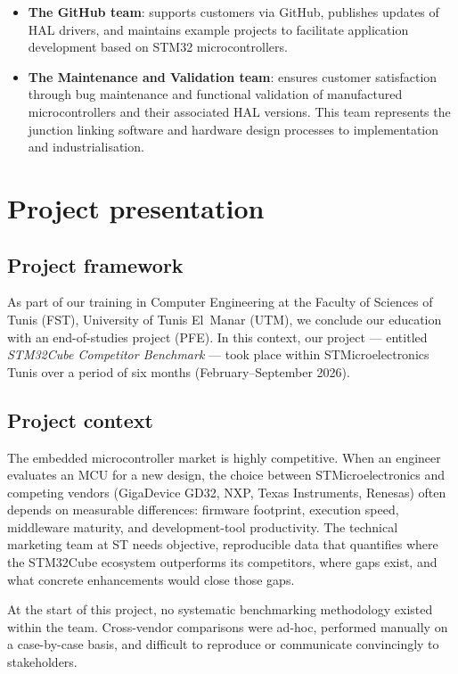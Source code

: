 \begin{itemize}
\item \textbf{The GitHub team}: supports customers via GitHub, publishes updates of HAL
drivers, and maintains example projects to facilitate application development based on
STM32 microcontrollers.
\item \textbf{The Maintenance and Validation team}: ensures customer satisfaction through
bug maintenance and functional validation of manufactured microcontrollers and their
associated HAL versions. This team represents the junction linking software and hardware
design processes to implementation and industrialisation.
\end{itemize}

\section{Project presentation}
\label{sec:project-presentation}

\subsection{Project framework}

As part of our training in Computer Engineering at the Faculty of Sciences of Tunis (FST),
University of Tunis El~Manar (UTM), we conclude our education with an end-of-studies
project (PFE). In this context, our project --- entitled \emph{STM32Cube Competitor
Benchmark} --- took place within STMicroelectronics Tunis over a period of six months
(February--September 2026).

\subsection{Project context}
\label{sec:project-context}

The embedded microcontroller market is highly competitive. When an engineer evaluates an MCU
for a new design, the choice between STMicroelectronics and competing vendors (GigaDevice
GD32, NXP, Texas Instruments, Renesas) often depends on measurable differences: firmware
footprint, execution speed, middleware maturity, and development-tool productivity. The
technical marketing team at ST needs objective, reproducible data that quantifies where the
STM32Cube ecosystem outperforms its competitors, where gaps exist, and what concrete
enhancements would close those gaps.

At the start of this project, no systematic benchmarking methodology existed within the
team. Cross-vendor comparisons were ad-hoc, performed manually on a case-by-case basis,
and difficult to reproduce or communicate convincingly to stakeholders.

